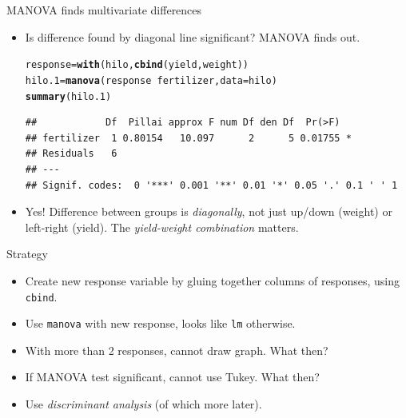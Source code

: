 \documentclass[unknownkeysallowed]{beamer}\usepackage[]{graphicx}\usepackage[]{color}
\makeatletter
\newcommand{\hlopt}[1]{\textcolor[rgb]{0,0,0}{#1}}%
\newcommand{\hlstd}[1]{\textcolor[rgb]{0.345,0.345,0.345}{#1}}%
\newcommand{\hlkwb}[1]{\textcolor[rgb]{0.69,0.353,0.396}{#1}}%
\newcommand{\hlkwc}[1]{\textcolor[rgb]{0.333,0.667,0.333}{#1}}%
\newcommand{\hlkwd}[1]{\textcolor[rgb]{0.737,0.353,0.396}{\textbf{#1}}}%
\newenvironment{kframe}{%
 \def\at@end@of@kframe{}%
 \ifinner\ifhmode%
  \def\at@end@of@kframe{\end{minipage}}%
  \begin{minipage}{\columnwidth}%
 \fi\fi%
 \def\FrameCommand##1{\hskip\@totalleftmargin \hskip-\fboxsep
 \colorbox{shadecolor}{##1}\hskip-\fboxsep
     \hskip-\linewidth \hskip-\@totalleftmargin \hskip\columnwidth}%
 \MakeFramed {\advance\hsize-\width
   \@totalleftmargin\z@ \linewidth\hsize
   \@setminipage}}%
 {\par\unskip\endMakeFramed%
 \at@end@of@kframe}
\newenvironment{knitrout}{}{} %
\makeatother
\begin{document}
\begin{frame}[fragile]{MANOVA finds multivariate differences}
  
  \begin{itemize}
  \item Is difference found by diagonal line significant? MANOVA finds out.


\begin{knitrout}\footnotesize
{}\color{fgcolor}\begin{kframe}
\begin{alltt}
\hlstd{response}\hlkwb{=}\hlkwd{with}\hlstd{(hilo,}\hlkwd{cbind}\hlstd{(yield,weight))}
\hlstd{hilo.1}\hlkwb{=}\hlkwd{manova}\hlstd{(response}\hlopt{~}\hlstd{fertilizer,}\hlkwc{data}\hlstd{=hilo)}
\hlkwd{summary}\hlstd{(hilo.1)}
\end{alltt}
\begin{verbatim}
##            Df  Pillai approx F num Df den Df  Pr(>F)  
## fertilizer  1 0.80154   10.097      2      5 0.01755 *
## Residuals   6                                         
## ---
## Signif. codes:  0 '***' 0.001 '**' 0.01 '*' 0.05 '.' 0.1 ' ' 1
\end{verbatim}
\end{kframe}
\end{knitrout}
    

\item Yes! Difference between groups is \emph{diagonally}, not just up/down
(weight) or left-right (yield). The \emph{yield-weight combination} matters.

  \end{itemize}

\end{frame}

\begin{frame}[fragile]{Strategy}

\begin{itemize}
\item Create new response variable by gluing together columns of
  responses, using \texttt{cbind}.
\item Use \texttt{manova} with new response, looks like \texttt{lm} otherwise.
\item With more than 2 responses, cannot draw graph. What then?
\item If MANOVA test significant, cannot use Tukey. What then?
\item Use {\em discriminant analysis} (of which more later).
\end{itemize}

\end{frame}
\end{document}
